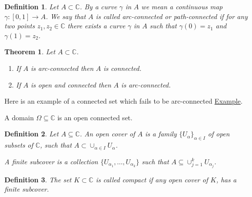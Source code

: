 \documentclass{amsart}
\newtheorem{thm}{Theorem}
\newtheorem{mydef}{Definition}
\begin{document}
\begin{mydef}
Let \(A\subset \mathbb{C}\). By a curve \(\gamma\) in \(A\) we mean a continuous map \(\gamma:[0,1]\to A\). We say that \(A\) is called \alert{arc-connected} or \alert{path-connected} if for any
two points \(z_1, z_2 \in \mathbb{C}\) there exists a curve \(\gamma\) in \(A\) such that \(\gamma(0) = z_1\) and \(\gamma(1) = z_2\).
\end{mydef}


\begin{thm}
Let \(A\subset \mathbb{C}\).
\begin{enumerate}
\item If \(A\) is arc-connected then \(A\) is connected.
\item If \(A\) is open and connected then \(A\) is arc-connected.
\end{enumerate}
\end{thm}

Here is an example of a connected set which fails to be arc-connected \href{https://en.wikipedia.org/wiki/Topologist\%27s\_sine\_curve}{Example}.

A \alert{domain} \(\Omega \subseteq \mathbb{C}\) is an open connected set.


\begin{mydef}
Let \(A\subseteq \mathbb{C}\). An open cover of \(A\) is a family  \(\{U_{\alpha}\}_{\alpha \in I}\) of open subsets of \(\mathbb{C}\), such that \(A\subset \cup_{\alpha\in I} U_{\alpha}\). 

A finite subcover is a collection \(\{ U_{\alpha_1},\ldots, U_{\alpha_k}\}\) such that \(A \subseteq \cup_{j=1}^k U_{\alpha_j}\).
\end{mydef}

\begin{mydef}
The set \(K\subset \mathbb{C}\) is called \alert{compact} if any open cover of \(K\), has a finite subcover.
\end{mydef}
\end{document}
